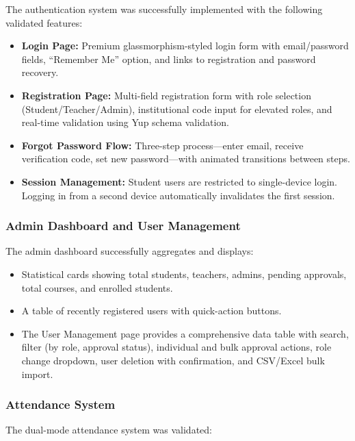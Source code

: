 The authentication system was successfully implemented with the following validated features:

\begin{itemize}[leftmargin=2em]
    \item \textbf{Login Page:} Premium glassmorphism-styled login form with email/password fields, ``Remember Me'' option, and links to registration and password recovery.
    \item \textbf{Registration Page:} Multi-field registration form with role selection (Student/Teacher/Admin), institutional code input for elevated roles, and real-time validation using Yup schema validation.
    \item \textbf{Forgot Password Flow:} Three-step process---enter email, receive verification code, set new password---with animated transitions between steps.
    \item \textbf{Session Management:} Student users are restricted to single-device login. Logging in from a second device automatically invalidates the first session.
\end{itemize}

\subsubsection{Admin Dashboard and User Management}

The admin dashboard successfully aggregates and displays:

\begin{itemize}[leftmargin=2em]
    \item Statistical cards showing total students, teachers, admins, pending approvals, total courses, and enrolled students.
    \item A table of recently registered users with quick-action buttons.
    \item The User Management page provides a comprehensive data table with search, filter (by role, approval status), individual and bulk approval actions, role change dropdown, user deletion with confirmation, and CSV/Excel bulk import.
\end{itemize}

\subsubsection{Attendance System}

The dual-mode attendance system was validated:

